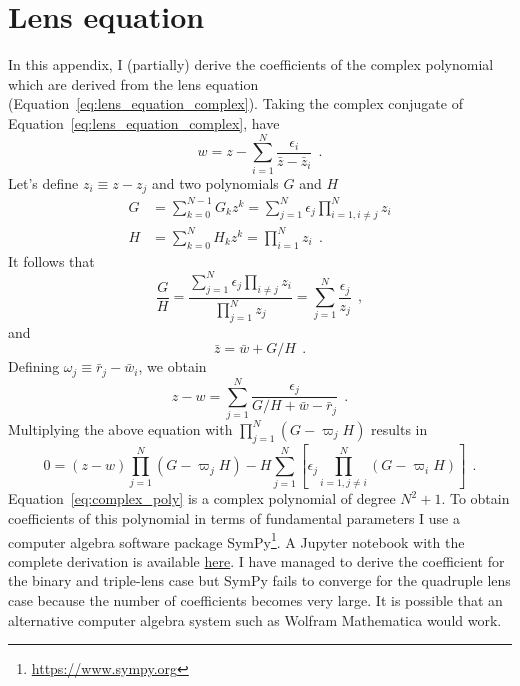 \documentclass[12pt,dvipsnames]{report}
\newcommand{\ssf}[1]{\textsf{#1}}
\newcommand{\hquad}{~~}
\begin{document}
\section{Lens equation}
In this appendix, I (partially) derive the coefficients of the complex
polynomial which are derived from the lens equation
(Equation~\ref{eq:lens_equation_complex}). Taking the complex conjugate of
Equation~\ref{eq:lens_equation_complex}, have
\begin{equation}
    w=z-\sum_{i=1}^{N} \frac{\epsilon_{i}}{\bar{z}-\bar{z}_{i}}
    \hquad.
\end{equation}
Let's define $z_i\equiv z - z_j$ and two polynomials $G$ and $H$
\begin{align}
    G & =\sum_{k=0}^{N-1} G_{k} z^{k} =\sum_{j=1}^{N} \epsilon_{j} \prod_{i=1, i \neq j}^{N} z_{i} \\
    H & =\sum_{k=0}^{N} H_{k} z^{k}   =\prod_{i=1}^{N} z_{i}
    \hquad.
\end{align}
It follows that
\begin{equation}
    \frac{G}{H}=\frac{\sum_{j=1}^{N} \epsilon_{j}
        \prod_{i \neq j} z_{i}}{\prod_{j=1}^{N} z_{j}}=\sum_{j=1}^{N} \frac{\epsilon_{j}}{z_{j}}
        \hquad,
\end{equation}
and
\begin{equation}
    \bar{z}=\bar{w}+G / H
    \hquad.
\end{equation}
Defining $\omega_{j} \equiv \bar{r}_{j}-\bar{w}_{i}$, we obtain
\begin{equation}
    z-w=\sum_{j=1}^{N} \frac{\epsilon_{j}}{G / H+\bar{w}-\bar{r}_{j}}
    \hquad.
\end{equation}
Multiplying the above equation with $\prod_{j=1}^{N}\left(G-\varpi_{j} H\right)$
results in
\begin{equation}
    0=(z-w) \prod_{j=1}^{N}\left(G-\varpi_{j} H\right)-
    H \sum_{j=1}^{N}\left[\epsilon_{j} \prod_{i=1, j \neq i}^{N}\left(G-\varpi_{i} H\right)\right]
    \hquad.
    \label{eq:complex_poly}
\end{equation}
Equation~\ref{eq:complex_poly} is a complex polynomial of degree $N^2+1$. To obtain coefficients of this
polynomial in terms of fundamental parameters I use a computer algebra software package \ssf{SymPy}\footnote{
    \url{https://www.sympy.org}
}\citep{10.7717/peerj-cs.103}. A Jupyter notebook with the complete derivation is available
\href{https://github.com/fbartolic/caustics/blob/main/notebooks/ComplexPolynomialCoefficients.ipynb}{here}.
I have managed to derive the coefficient for the binary and triple-lens case but \ssf{SymPy} fails to
converge for the quadruple lens case because the number of coefficients becomes very large.
It is possible that an alternative computer algebra system such as Wolfram Mathematica would work.
\end{document}
